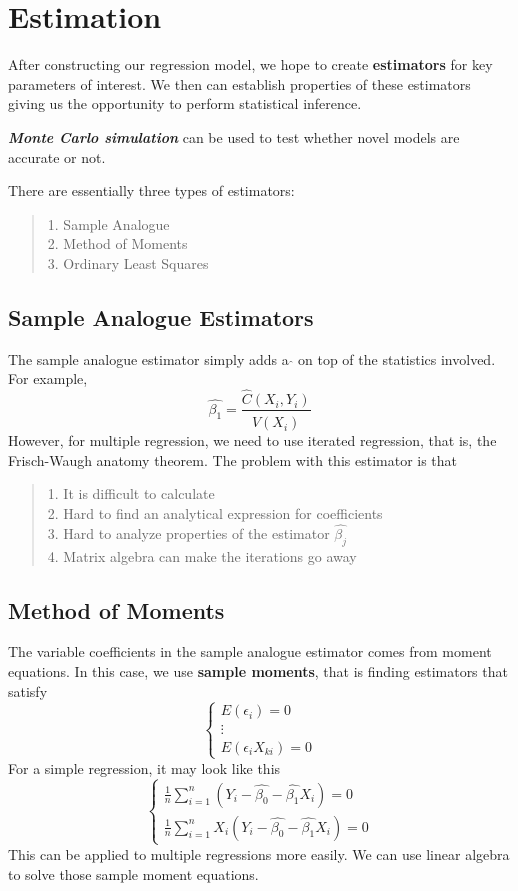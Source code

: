\section{Estimation}
After constructing our regression model, we hope to create \textbf{estimators} for key parameters of interest. We then can establish properties of these estimators giving us the opportunity to perform statistical inference.

\textbf{\textit{Monte Carlo simulation}} can be used to test whether novel models are accurate or not.

There are essentially three types of estimators:
\begin{quote}
    1. Sample Analogue \\
    2. Method of Moments \\
    3. Ordinary Least Squares
\end{quote}

\subsection{Sample Analogue Estimators}
The sample analogue estimator simply adds a $\hat{}$ on top of the statistics involved. For example,
$$\hat{\beta_1} = \frac{\hat{C}(X_i, Y_i)}{\hat{V}(X_i)}$$
However, for multiple regression, we need to use iterated regression, that is, the Frisch-Waugh anatomy theorem. The problem with this estimator is that
\begin{quote}
    1. It is difficult to calculate \\
    2. Hard to find an analytical expression for coefficients \\
    3. Hard to analyze properties of the estimator $\hat{\beta_{j}}$ \\
    4. Matrix algebra can make the iterations go away
\end{quote}

\subsection{Method of Moments}
The variable coefficients in the sample analogue estimator comes from moment equations. In this case, we use \textbf{sample moments}, that is finding estimators that satisfy
$$\begin{cases}
    E(\epsilon_i) = 0 \\
    \vdots \\
    E(\epsilon_i X_{ki}) = 0
\end{cases}$$
For a simple regression, it may look like this
$$\begin{cases}
    \frac{1}{n} \sum_{i=1}^{n} (Y_i - \hat{\beta_0} - \hat{\beta_1}X_i) = 0 \\
    \frac{1}{n} \sum_{i=1}^{n} X_i(Y_i - \hat{\beta_0} - \hat{\beta_1}X_i) = 0
\end{cases}$$
This can be applied to multiple regressions more easily. We can use linear algebra to solve those sample moment equations.

